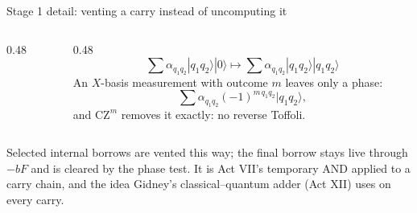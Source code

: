 \documentclass[aspectratio=169,11pt]{beamer}
\newcommand{\oplusat}[2]{\draw[thick,color=body] (#1,#2) circle (1.6mm);
  \draw[thick,color=body] (#1-0.16,#2) -- (#1+0.16,#2); \draw[thick,color=body] (#1,#2-0.16) -- (#1,#2+0.16);}
\begin{document}
\begin{frame}{Stage 1 detail: venting a carry instead of uncomputing it}
  \begin{columns}[c]
    \begin{column}{0.48\textwidth}
      \centering
    \end{column}
    \begin{column}{0.48\textwidth}
      \small
      \[ \textstyle\sum\alpha_{q_1q_2}|q_1q_2\rangle|0\rangle\mapsto\sum\alpha_{q_1q_2}|q_1q_2\rangle|q_1q_2\rangle \]
      An $X$-basis measurement with outcome $m$ leaves only a phase:
      \[ \textstyle\sum\alpha_{q_1q_2}(-1)^{m\,q_1q_2}|q_1q_2\rangle , \]
      and $\mathrm{CZ}^m$ removes it exactly: no reverse Toffoli.
    \end{column}
  \end{columns}
  \vskip3mm
  {\small Selected internal borrows are vented this way; the final borrow stays live through $-bF$ and is cleared by the phase test. It is Act VII's temporary AND applied to a carry chain, and the idea Gidney's classical--quantum adder (Act XII) uses on every carry.}
\end{frame}
\end{document}
